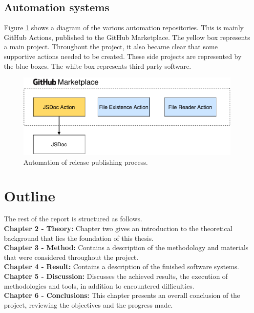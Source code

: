 \subsection{Automation systems}
Figure \ref{fig:automation-systems-overview} shows a diagram of the various automation repositories. This is mainly GitHub Actions, published to the GitHub Marketplace. The yellow box represents a main project. Throughout the project, it also became clear that some supportive actions needed to be created. These side projects are represented by the blue boxes. The white box represents third party software.
\begin{figure}[ht]
    \centering
    \includegraphics[page=1,scale=0.85]{sections/introduction/figures/automation-systems-overview.pdf}
    \caption{Automation of release publishing process.}
    \label{fig:automation-systems-overview}
\end{figure}

\section{Outline}

The rest of the report is structured as follows.\\
\break
\textbf{Chapter 2 - Theory:} Chapter two gives an introduction to the theoretical background that lies the foundation of this thesis.\\
\textbf{Chapter 3 - Method:} Contains a description of the methodology and materials that were considered throughout the project.\\
\textbf{Chapter 4 - Result:} Contains a description of the finished software systems.\\
\textbf{Chapter 5 - Discussion:} Discusses the achieved results, the execution of methodologies and tools, in addition to encountered difficulties.\\
\textbf{Chapter 6 - Conclusions:} This chapter presents an overall conclusion of the project, reviewing the objectives and the progress made.\\